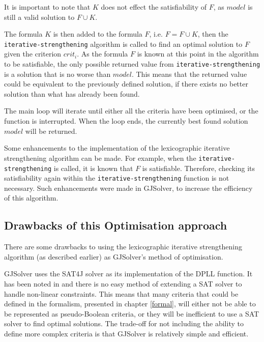 It is important to note that $K$ does not effect the satisfiability of $F$, as $model$ is still a valid solution to $F \cup K$.

The formula $K$ is then added to the formula $F$, i.e. $F = F \cup K$,
then the \texttt{iterative-strengthening} algorithm is called to find an optimal solution to $F$ given the criterion $crit_i$.
As the formula $F$ is known at this point in the algorithm to be satisfiable, the only possible returned value from \texttt{iterative-strengthening}
is a solution that is no worse than $model$.
This means that the returned value could be equivalent to the previously defined solution, if there exists no better solution than what has already been found.

The main loop will iterate until either all the criteria have been optimised, or the function is interrupted.
When the loop ends, the currently best found solution $model$ will be returned.

Some enhancements to the implementation of the lexicographic iterative strengthening algorithm can be made.
For example, when the \texttt{iterative-strengthening} is called, it is known that $F$ is satisfiable. 
Therefore, checking its satisfiability again within the \texttt{iterative-strengthening} function is not necessary.
Such enhancements were made in GJSolver, to increase the efficiency of this algorithm. 

\subsection{Drawbacks of this Optimisation approach}
There are some drawbacks to using the lexicographic iterative strengthening algorithm (as described earlier) 
as GJSolver's method of optimisation.

GJSolver uses the SAT4J solver as its implementation of the DPLL function. 
It has been noted in \citep{le_berre_dependency_2009} and \citep{leBerre2010} there is no easy method of extending a SAT solver to handle non-linear constraints.
This means that many criteria that could be defined in the formalism, presented in chapter \ref{formal}, will either not be able to be represented as pseudo-Boolean criteria, 
or they will be inefficient to use a SAT solver to find optimal solutions.  
The trade-off for not including the ability to define more complex criteria is that GJSolver is relatively simple and efficient. 

